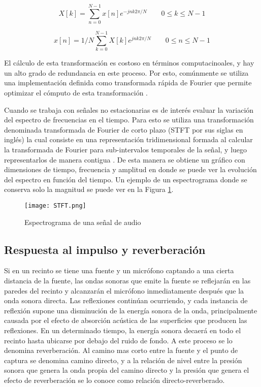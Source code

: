 \begin{equation}
\label{eqn:furier1}
	X[k] = \sum_{n=0}^{N-1} x[n]e^{-jnk2\pi/N} \qquad  0\leq k \leq N-1
\end{equation} 

\begin{equation}
\label{eqn:furier2}
	x[n] = {1}/{N}\sum_{k=0}^{N-1} X[k]e^{jnk2\pi/N} \qquad  0\leq n \leq N-1
\end{equation} 

El cálculo de esta transformación es costoso en términos computacinoales, y hay un alto grado de redundancia en este proceso. Por esto, comúnmente se utiliza una implementación definida como transformada rápida de Fourier que permite optimizar el cómputo de esta transformación \cite{fft}. 

Cuando se trabaja con señales no estacionarias es de interés evaluar la variación del espectro de frecuencias en el tiempo. Para esto se utiliza una transformación denominada transformada de Fourier de corto plazo (STFT por sus siglas en inglés) la cual consiste en una representación tridimensional formada al calcular la transformada de Fourier para sub-intervalos temporales de la señal, y luego representarlos de manera contigua \cite{ritmo}. De esta manera se obtiene un gráfico con dimensiones de tiempo, frecuencia y amplitud en donde se puede ver la evolución del espectro en función del tiempo. Un ejemplo de un espectrograma donde se conserva solo la magnitud se puede ver en la Figura \ref{fig:STFT}. 
 
 \begin{figure}[H]
  \centering{}
  \texttt{[image: STFT.png]}
  \caption{Espectrograma de una señal de audio}
  \label{fig:STFT}
\end{figure}


\subsection{Respuesta al impulso y reverberación}

Si en un recinto se tiene una fuente y un micrófono captando a una cierta distancia de la fuente, las ondas sonoras que emite la fuente se reflejarán en las paredes del recinto y alcanzarán el micrófono inmediatamente después que la onda sonora directa. Las reflexiones continúan ocurriendo, y cada instancia de reflexión supone una disminución de la energía sonora de la onda, principalmente causada por el efecto de absorción acústica de las superficies que producen las reflexiones. En un determinado tiempo, la energía sonora decaerá en todo el recinto hasta ubicarse por debajo del ruido de fondo. A este proceso se lo denomina reverberación. Al camino mas corto entre la fuente y el punto de captura se denomina camino directo, y a la relación de nivel entre la presión sonora que genera la onda propia del camino directo y la presión que genera el efecto de reverberación se lo conoce como relación directo-reverberado. 

